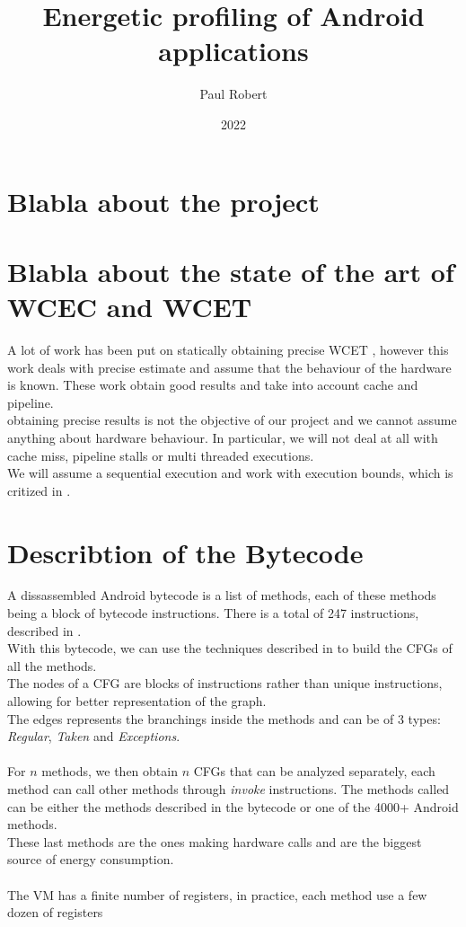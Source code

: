 \documentclass{article}
\title{Energetic profiling of Android applications}
\author{Paul Robert}
\date{2022}
\begin{document}
\maketitle
    
\section*{Blabla about the project}

\section*{Blabla about the state of the art of WCEC and WCET}

A lot of work has been put on statically obtaining precise WCET \cite{wilhelm_abstract_2008}, however this work deals with precise estimate and assume that the behaviour of the hardware is known. 
These work obtain good results and take into account cache and pipeline.\\
obtaining precise results is not the objective of our project and we cannot assume anything about hardware behaviour. In particular, we will not deal at all with cache miss, pipeline stalls or multi threaded executions.\\
We will assume a sequential execution and work with execution bounds, which is critized in \cite{wilhelm_real_2020}. 


\section*{Describtion of the Bytecode}
A dissassembled Android bytecode is a list of methods, each of these methods being a block of bytecode instructions.
There is a total of 247 instructions, described in \cite{noauthor_dalvik_nodate}.\\
With this bytecode, we can use the techniques described in \cite{zhao_analyzing_1999} to build the CFGs of all the methods.\\
The nodes of a CFG are blocks of instructions rather than unique instructions, allowing for better representation of the graph.\\
The edges represents the branchings inside the methods and can be of 3 types: \emph{Regular}, \emph{Taken} and \emph{Exceptions}.\\\\
For $n$ methods, we then obtain $n$ CFGs that can be analyzed separately, each method can call other methods through \emph{invoke} instructions. The methods called can be either the methods described in the bytecode or one of the 4000+ Android methods.\\
These last methods are the ones making hardware calls and are the biggest source of energy consumption.\\\\
The VM has a finite number of registers, in practice, each method use a few dozen of registers 
\end{document}
